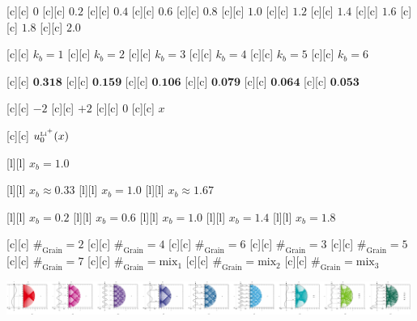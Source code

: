  [c][c] {\tiny $0$}
 [c][c] {\tiny $0.2$}
 [c][c] {\tiny $0.4$}
 [c][c] {\tiny $0.6$}
 [c][c] {\tiny $0.8$}
[c][c] {\tiny $1.0$}
[c][c] {\tiny $1.2$}
[c][c] {\tiny $1.4$}
[c][c] {\tiny $1.6$}
[c][c] {\tiny $1.8$}
[c][c] {\tiny $2.0$}



[c][c] {\tiny $k_{b} = 1$}
[c][c] {\tiny $k_{b} = 2$}
[c][c] {\tiny $k_{b} = 3$}
[c][c] {\tiny $k_{b} = 4$}
[c][c] {\tiny $k_{b} = 5$}
[c][c] {\tiny $k_{b} = 6$}

[c][c] {\tiny $\textbf{0.318}$}
[c][c] {\tiny $\textbf{0.159}$}
[c][c] {\tiny $\textbf{0.106}$}
[c][c] {\tiny $\textbf{0.079}$}
[c][c] {\tiny $\textbf{0.064}$}
[c][c] {\tiny $\textbf{0.053}$}

[c][c] {\tiny $-2$}
[c][c] {\tiny $+2$}
[c][c]   {\tiny $0$}
[c][c]   {\tiny $x$}

[c][c]  {\tiny $u_{0}^{\text{\tiny Li}^{\tiny +}}(x)$}

[l][l] {\tiny $x_{b} = 1.0$}

[l][l] {\tiny $x_{b} \approx 0.33$}
[l][l] {\tiny $x_{b} = 1.0$}
[l][l] {\tiny $x_{b} \approx 1.67$}

[l][l] {\tiny $x_{b} = 0.2$}
[l][l] {\tiny $x_{b} = 0.6$}
[l][l] {\tiny $x_{b} = 1.0$}
[l][l] {\tiny $x_{b} = 1.4$}
[l][l] {\tiny $x_{b} = 1.8$}

[c][c] {\footnotesize $\#_{\text{Grain}}=2$}
[c][c] {\footnotesize $\#_{\text{Grain}}=4$}
[c][c] {\footnotesize $\#_{\text{Grain}}=6$}
[c][c] {\footnotesize $\#_{\text{Grain}}=3$}
[c][c] {\footnotesize $\#_{\text{Grain}}=5$}
[c][c] {\footnotesize $\#_{\text{Grain}}=7$}
[c][c] {\footnotesize $\#_{\text{Grain}}=\text{mix}_1$}
[c][c] {\footnotesize $\#_{\text{Grain}}=\text{mix}_2$}
[c][c] {\footnotesize $\#_{\text{Grain}}=\text{mix}_3$}

\includegraphics[width=0.99\textwidth]{characsin_rotate_semicircle_135246mix_horizontal.eps}